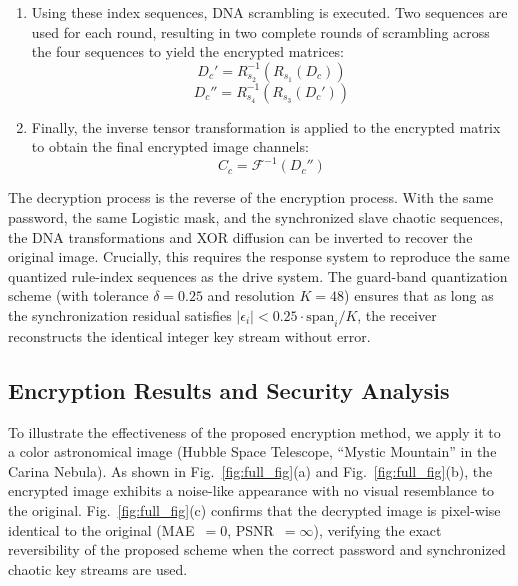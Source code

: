 \documentclass[a4paper,fleqn]{cas-dc}
\theoremstyle{plain}
\theoremstyle{definition}
\begin{document}
\begin{enumerate}
\item
Using these index sequences, DNA scrambling is executed. Two sequences are used for each round, resulting in two complete rounds of scrambling across the four sequences to yield the encrypted matrices:
\begin{equation}
	D_c' = R_{s_2}^{-1}(R_{s_1}(D_c))
\end{equation}
\begin{equation}
	D_c'' = R_{s_4}^{-1}(R_{s_3}(D_c'))
\end{equation}

\item
Finally, the inverse tensor transformation is applied to the encrypted matrix to obtain the final encrypted image channels:
\begin{equation}
	C_c = \mathcal{F}^{-1}(D_c'')
\end{equation}

\end{enumerate}

The decryption process is the reverse of the encryption process. With the same password, the same Logistic mask, and the synchronized slave chaotic sequences, the DNA transformations and XOR diffusion can be inverted to recover the original image. Crucially, this requires the response system to reproduce the same quantized rule-index sequences as the drive system. The guard-band quantization scheme (with tolerance $\delta = 0.25$ and resolution $K = 48$) ensures that as long as the synchronization residual satisfies $|\epsilon_i| < 0.25 \cdot \mathrm{span}_i / K$, the receiver reconstructs the identical integer key stream without error.

\subsection{Encryption Results and Security Analysis}

To illustrate the effectiveness of the proposed encryption method, we apply it to a color astronomical image (Hubble Space Telescope, ``Mystic Mountain'' in the Carina Nebula). As shown in Fig.~\ref{fig:full_fig}(a) and Fig.~\ref{fig:full_fig}(b), the encrypted image exhibits a noise-like appearance with no visual resemblance to the original. Fig.~\ref{fig:full_fig}(c) confirms that the decrypted image is pixel-wise identical to the original (MAE~$= 0$, PSNR~$= \infty$), verifying the exact reversibility of the proposed scheme when the correct password and synchronized chaotic key streams are used.
\end{document}
